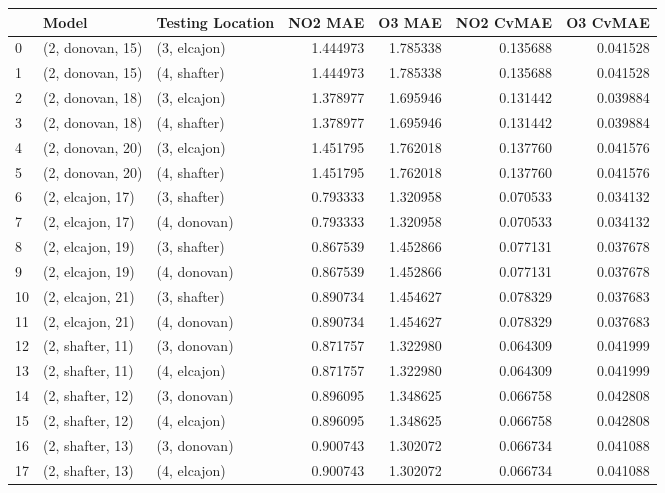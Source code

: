 \begin{tabular}{lllrrrr}
\toprule
{} &             Model & Testing Location &   NO2 MAE &    O3 MAE &  NO2 CvMAE &  O3 CvMAE \\
\midrule
0  &  (2, donovan, 15) &     (3, elcajon) &  1.444973 &  1.785338 &   0.135688 &  0.041528 \\
1  &  (2, donovan, 15) &     (4, shafter) &  1.444973 &  1.785338 &   0.135688 &  0.041528 \\
2  &  (2, donovan, 18) &     (3, elcajon) &  1.378977 &  1.695946 &   0.131442 &  0.039884 \\
3  &  (2, donovan, 18) &     (4, shafter) &  1.378977 &  1.695946 &   0.131442 &  0.039884 \\
4  &  (2, donovan, 20) &     (3, elcajon) &  1.451795 &  1.762018 &   0.137760 &  0.041576 \\
5  &  (2, donovan, 20) &     (4, shafter) &  1.451795 &  1.762018 &   0.137760 &  0.041576 \\
6  &  (2, elcajon, 17) &     (3, shafter) &  0.793333 &  1.320958 &   0.070533 &  0.034132 \\
7  &  (2, elcajon, 17) &     (4, donovan) &  0.793333 &  1.320958 &   0.070533 &  0.034132 \\
8  &  (2, elcajon, 19) &     (3, shafter) &  0.867539 &  1.452866 &   0.077131 &  0.037678 \\
9  &  (2, elcajon, 19) &     (4, donovan) &  0.867539 &  1.452866 &   0.077131 &  0.037678 \\
10 &  (2, elcajon, 21) &     (3, shafter) &  0.890734 &  1.454627 &   0.078329 &  0.037683 \\
11 &  (2, elcajon, 21) &     (4, donovan) &  0.890734 &  1.454627 &   0.078329 &  0.037683 \\
12 &  (2, shafter, 11) &     (3, donovan) &  0.871757 &  1.322980 &   0.064309 &  0.041999 \\
13 &  (2, shafter, 11) &     (4, elcajon) &  0.871757 &  1.322980 &   0.064309 &  0.041999 \\
14 &  (2, shafter, 12) &     (3, donovan) &  0.896095 &  1.348625 &   0.066758 &  0.042808 \\
15 &  (2, shafter, 12) &     (4, elcajon) &  0.896095 &  1.348625 &   0.066758 &  0.042808 \\
16 &  (2, shafter, 13) &     (3, donovan) &  0.900743 &  1.302072 &   0.066734 &  0.041088 \\
17 &  (2, shafter, 13) &     (4, elcajon) &  0.900743 &  1.302072 &   0.066734 &  0.041088 \\

\end{tabular}
